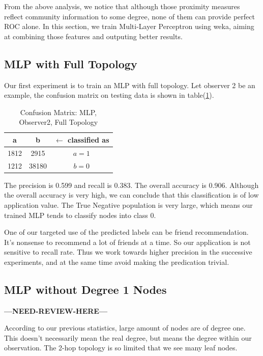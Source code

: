 \documentclass[11pt,a4paper]{article}
\newcommand{\question}{\textbf{---NEED-REVIEW-HERE---}}
\begin{document}
From the above analysis, we notice that although those 
proximity measures reflect community information to some degree, 
none of them can provide perfect ROC alone. In this section, 
we train Multi-Layer Perceptron using weka\cite{weka}, aiming at
combining those features and outputing better results. 

\subsection{MLP with Full Topology}

Our first experiment is to train an MLP with full topology. 
Let observer 2 be an example, the confusion matrix on testing 
data is shown in table(\ref{tbl:cm_o2_full}). 

\begin{table}[htb]
	\centering
	\caption{Confusion Matrix: MLP, Observer2, Full Topology}
	\label{tbl:cm_o2_full}
	\begin{tabular}{cc|c}
	\hline
a & b & \textbf{$\leftarrow$ classified as}\\	
	\hline
1812 &  2915 &    $a = 1$ \\
1212 & 38180 &    $b = 0$\\
	\hline
	\end{tabular}
\end{table}

The precision is 0.599 and recall is 0.383. The overall accuracy 
is 0.906. Although the overall accuracy is very high, we can 
conclude that this classification is of low application value. 
The True Negative population is very large, which means our trained 
MLP tends to classify nodes into class 0. 

One of our targeted use of the predicted labels can be friend 
recommendation. It's nonsense to recommend a lot of friends 
at a time. So our application is not sensitive to recall rate. 
Thus we work towards higher precision in the successive experiments, 
and at the same time avoid making the predication trivial. 

\subsection{MLP without Degree 1 Nodes}

\question

According to our previous statistics, large amount of nodes
are of degree one. This doesn't necessarily mean the real 
degree, but means the degree within our observation. 
The 2-hop topology is so limited that we see many leaf nodes. 
\end{document}
